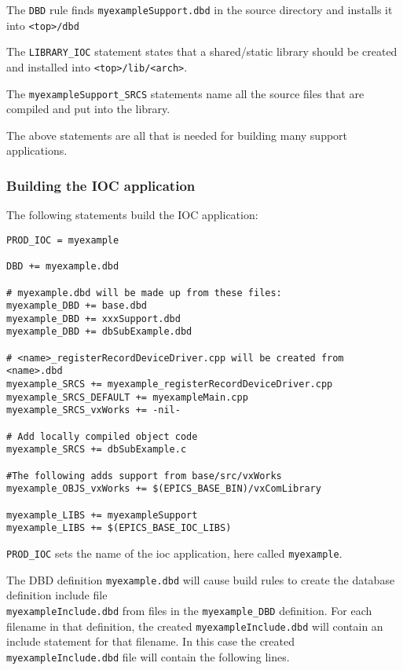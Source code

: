 The \verb|DBD| rule finds \verb|myexampleSupport.dbd| in the source directory and installs it into \verb|<top>/dbd|

The \verb|LIBRARY_IOC| statement states that a shared/static library should be created and installed into \verb|<top>/lib/<arch>|.

The \verb|myexampleSupport_SRCS| statements name all the source files that are compiled and put into the library.

The above statements are all that is needed for building many support applications.

\subsubsection{Building the IOC application}

The following statements build the IOC application:

\begin{verbatim}
PROD_IOC = myexample

DBD += myexample.dbd

# myexample.dbd will be made up from these files:
myexample_DBD += base.dbd
myexample_DBD += xxxSupport.dbd
myexample_DBD += dbSubExample.dbd

# <name>_registerRecordDeviceDriver.cpp will be created from <name>.dbd
myexample_SRCS += myexample_registerRecordDeviceDriver.cpp
myexample_SRCS_DEFAULT += myexampleMain.cpp
myexample_SRCS_vxWorks += -nil-

# Add locally compiled object code
myexample_SRCS += dbSubExample.c

#The following adds support from base/src/vxWorks
myexample_OBJS_vxWorks += $(EPICS_BASE_BIN)/vxComLibrary

myexample_LIBS += myexampleSupport
myexample_LIBS += $(EPICS_BASE_IOC_LIBS)
\end{verbatim}

\verb|PROD_IOC| sets the name of the ioc application, here called \verb|myexample|.

The DBD definition \verb|myexample.dbd| will cause build rules to create the database definition include file \\
\verb|myexampleInclude.dbd| from files in the \verb|myexample_DBD| definition. For each filename in that
definition, the created \verb|myexampleInclude.dbd| will contain an include statement for that filename.
In this case the created \verb|myexampleInclude.dbd| file will contain the following lines.

